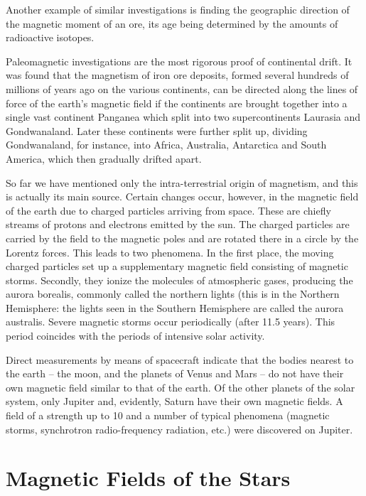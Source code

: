 Another example of similar investigations is finding the geographic direction of the magnetic moment of an ore, its age being determined by the amounts of radioactive isotopes.

Paleomagnetic investigations are the most rigorous proof of continental drift. It was found that the magnetism of iron ore deposits, formed several hundreds of millions of years ago on the various continents, can be directed along the lines of force of the earth's magnetic field if the continents are brought together into a single vast continent Panganea which split into two supercontinents Laurasia and Gondwanaland. Later these continents were further split up, dividing Gondwanaland, for instance, into Africa, Australia, Antarctica and South America, which then gradually drifted apart.

So far we have mentioned only the intra-terrestrial origin of magnetism, and this is actually its main source. Certain changes occur, however, in the magnetic field of the earth due to charged particles arriving from space. These are chiefly streams of protons and electrons emitted by the sun. The charged particles are carried by the field to the magnetic poles and are rotated there in a circle by the Lorentz forces. This leads to two phenomena. In the first place, the moving charged particles set up a supplementary magnetic field consisting of magnetic storms. Secondly, they ionize the molecules of atmospheric gases, producing the aurora borealis, commonly called the northern lights (this is in the Northern Hemisphere: the lights seen in the Southern Hemisphere are called the aurora australis. Severe magnetic storms occur periodically (after 11.5 years). This period coincides with the periods of intensive solar activity.

Direct measurements by means of spacecraft indicate that the bodies nearest to the earth -- the moon, and the planets of Venus and Mars -- do not have their own magnetic field similar to that of the earth. Of the other planets of the solar system, only Jupiter and, evidently, Saturn have their own magnetic fields. A field of a strength up to \SI{10}{\gauss} and a number of typical phenomena (magnetic storms, synchrotron radio-frequency radiation, etc.) were discovered on Jupiter.

\section{Magnetic Fields of the Stars}

